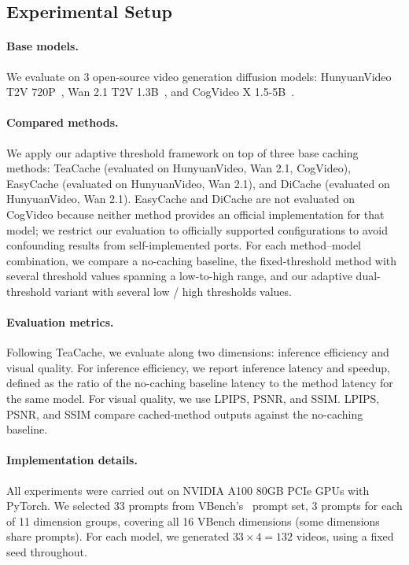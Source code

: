 \documentclass{article}
\begin{document}
\subsection{Experimental Setup}

\paragraph{Base models.}
We evaluate on 3 open-source video generation diffusion models: HunyuanVideo T2V 720P~\cite{kong2024hunyuanvideo}, Wan 2.1 T2V 1.3B~\cite{wang2025wan}, and CogVideo X 1.5-5B~\cite{hong2023cogvideo}.

\paragraph{Compared methods.}
We apply our adaptive threshold framework on top of three base caching methods: TeaCache (evaluated on HunyuanVideo, Wan 2.1, CogVideo), EasyCache (evaluated on HunyuanVideo, Wan 2.1), and DiCache (evaluated on HunyuanVideo, Wan 2.1). EasyCache and DiCache are not evaluated on CogVideo because neither method provides an official implementation for that model; we restrict our evaluation to officially supported configurations to avoid confounding results from self-implemented ports. For each method--model combination, we compare a no-caching baseline, the fixed-threshold method with several threshold values spanning a low-to-high range, and our adaptive dual-threshold variant \system with several low / high thresholds values.

\paragraph{Evaluation metrics.}
Following TeaCache, we evaluate along two dimensions: inference efficiency and visual quality. For inference efficiency, we report inference latency and speedup, defined as the ratio of the no-caching baseline latency to the method latency for the same model. For visual quality, we use LPIPS, PSNR, and SSIM. LPIPS, PSNR, and SSIM compare cached-method outputs against the no-caching baseline.

\paragraph{Implementation details.}
All experiments were carried out on NVIDIA A100 80GB PCIe GPUs with PyTorch. We selected 33 prompts from VBench's~\cite{huang2024vbench} prompt set, 3 prompts for each of 11 dimension groups, covering all 16 VBench dimensions (some dimensions share prompts). For each model, we generated $33 \times 4 = 132$ videos, using a fixed seed throughout.
\end{document}
